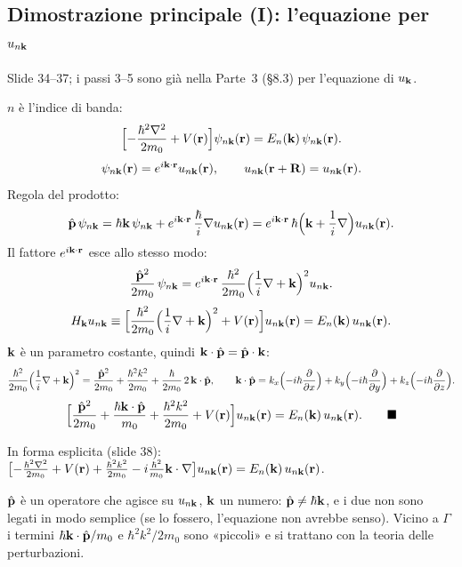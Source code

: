 \documentclass[11pt,a4paper]{article}
\begin{document}
\subsection{Dimostrazione principale (I): l'equazione per $u_{n\mathbf k}$}\label{sec:kpu}
Slide 34--37; i passi 3--5 sono già nella Parte~3 (§8.3) per l'equazione di $u_{\mathbf k}$.
\begin{dimostrazione}
$n$ è l'indice di banda:
\[
\Bigl[-\frac{\hbar^2\nabla^2}{2m_0}+V(\mathbf r)\Bigr]\psi_{n\mathbf k}(\mathbf r)=E_n(\mathbf k)\,\psi_{n\mathbf k}(\mathbf r).
\]
\[
\psi_{n\mathbf k}(\mathbf r)=e^{i\mathbf k\cdot\mathbf r}u_{n\mathbf k}(\mathbf r),\qquad u_{n\mathbf k}(\mathbf r+\mathbf R)=u_{n\mathbf k}(\mathbf r).
\]
Regola del prodotto:
\[
\hat{\mathbf p}\,\psi_{n\mathbf k}=\hbar\mathbf k\,\psi_{n\mathbf k}+e^{i\mathbf k\cdot\mathbf r}\,\frac\hbar i\nabla u_{n\mathbf k}(\mathbf r)=e^{i\mathbf k\cdot\mathbf r}\,\hbar\Bigl(\mathbf k+\frac1i\nabla\Bigr)u_{n\mathbf k}(\mathbf r).
\]
Il fattore $e^{i\mathbf k\cdot\mathbf r}$ esce allo stesso modo:
\[
\frac{\hat{\mathbf p}^2}{2m_0}\,\psi_{n\mathbf k}=e^{i\mathbf k\cdot\mathbf r}\,\frac{\hbar^2}{2m_0}\Bigl(\frac1i\nabla+\mathbf k\Bigr)^2u_{n\mathbf k}.
\]
\[
H_{\mathbf k}u_{n\mathbf k}\equiv\Bigl[\frac{\hbar^2}{2m_0}\Bigl(\frac1i\nabla+\mathbf k\Bigr)^2+V(\mathbf r)\Bigr]u_{n\mathbf k}(\mathbf r)=E_n(\mathbf k)\,u_{n\mathbf k}(\mathbf r).
\]
$\mathbf k$ è un parametro costante, quindi $\mathbf k\cdot\hat{\mathbf p}=\hat{\mathbf p}\cdot\mathbf k$:
\[
\frac{\hbar^2}{2m_0}\Bigl(\frac1i\nabla+\mathbf k\Bigr)^2=\frac{\hat{\mathbf p}^2}{2m_0}+\frac{\hbar^2k^2}{2m_0}+\frac{\hbar}{2m_0}\,2\,\mathbf k\cdot\hat{\mathbf p},\qquad
\mathbf k\cdot\hat{\mathbf p}=k_x\Bigl(-i\hbar\frac{\partial}{\partial x}\Bigr)+k_y\Bigl(-i\hbar\frac{\partial}{\partial y}\Bigr)+k_z\Bigl(-i\hbar\frac{\partial}{\partial z}\Bigr).
\]
\[
\Bigl[\frac{\hp^2}{2m_0}+\frac{\hbar\vk\cdot\hp}{m_0}+\frac{\hbar^2k^2}{2m_0}+V(\vr)\Bigr]u_{n\vk}(\vr)=E_n(\vk)\,u_{n\vk}(\vr).\qed
\]
\end{dimostrazione}
In forma esplicita (slide 38): $\bigl[-\frac{\hbar^2\nabla^2}{2m_0}+V(\mathbf r)+\frac{\hbar^2k^2}{2m_0}-i\frac{\hbar^2}{m_0}\mathbf k\cdot\nabla\bigr]u_{n\mathbf k}(\mathbf r)
=E_n(\mathbf k)\,u_{n\mathbf k}(\mathbf r)$.

\begin{interpretazione}
$\hat{\mathbf p}$ è un operatore che agisce su $u_{n\mathbf k}$, $\mathbf k$ un numero: $\hat{\mathbf p}\ne\hbar\mathbf k$, e i due non sono legati in modo semplice (se lo fossero, l'equazione
non avrebbe senso). Vicino a $\Gamma$ i termini $\hbar\mathbf k\cdot\hat{\mathbf p}/m_0$ e $\hbar^2k^2/2m_0$ sono «piccoli» e si trattano con la teoria delle
perturbazioni.
\end{interpretazione}
\end{document}

